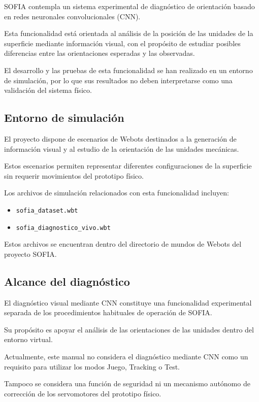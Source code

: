 \documentclass[letterpaper,journal]{IEEEtran}
\begin{document}
SOFIA contempla un sistema experimental de
diagnóstico de orientación basado en redes
neuronales convolucionales (CNN).

Esta funcionalidad está orientada al análisis
de la posición de las unidades de la superficie
mediante información visual, con el propósito
de estudiar posibles diferencias entre las
orientaciones esperadas y las observadas.

El desarrollo y las pruebas de esta
funcionalidad se han realizado en un
entorno de simulación, por lo que sus
resultados no deben interpretarse como
una validación del sistema físico.

\subsection{Entorno de simulación}

El proyecto dispone de escenarios de Webots
destinados a la generación de información
visual y al estudio de la orientación
de las unidades mecánicas.

Estos escenarios permiten representar
diferentes configuraciones de la superficie
sin requerir movimientos del prototipo físico.

Los archivos de simulación relacionados
con esta funcionalidad incluyen:

\begin{itemize}
    \item \texttt{sofia\_dataset.wbt}
    \item \texttt{sofia\_diagnostico\_vivo.wbt}
\end{itemize}

Estos archivos se encuentran dentro
del directorio de mundos de Webots
del proyecto SOFIA.

\subsection{Alcance del diagnóstico}

El diagnóstico visual mediante CNN
constituye una funcionalidad experimental
separada de los procedimientos habituales
de operación de SOFIA.

Su propósito es apoyar el análisis
de las orientaciones de las unidades
dentro del entorno virtual.

Actualmente, este manual no considera
el diagnóstico mediante CNN como
un requisito para utilizar los modos
Juego, Tracking o Test.

Tampoco se considera una función
de seguridad ni un mecanismo autónomo
de corrección de los servomotores
del prototipo físico.
\end{document}
